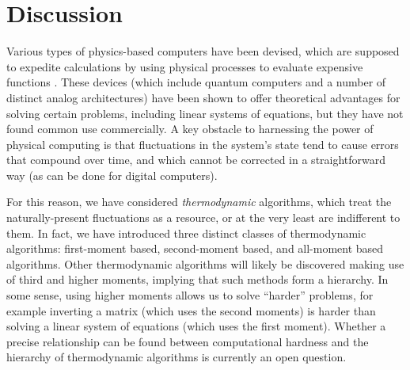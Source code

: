 \documentclass[prx,onecolumn,floatfix,longbibliography,notitlepage, nofootinbib,12pt]{revtex4-2}
\begin{document}
\section{Discussion}

Various types of physics-based computers have been devised, which are supposed to expedite calculations by using physical processes to evaluate expensive functions \cite{haensch2018next, small1993general,feynman1982simulating,preskill2018quantum, nielsen2000quantum}. These devices (which include quantum computers and a number of distinct analog architectures) have been shown to offer theoretical advantages for solving certain problems, including linear systems of equations, but they have not found common use commercially. A key obstacle to harnessing the power of physical computing is that fluctuations in the system's state tend to cause errors that compound over time, and which cannot be corrected in a straightforward way \cite{huang2017analog} (as can be done for digital computers). 

For this reason, we have considered \emph{thermodynamic} algorithms, which treat the naturally-present fluctuations as a resource, or at the very least are indifferent to them. In fact, we have introduced three distinct classes of thermodynamic algorithms: first-moment based, second-moment based, and all-moment based algorithms. Other thermodynamic algorithms will likely be discovered making use of third and higher moments, implying that such methods form a hierarchy. In some sense, using higher moments allows us to solve ``harder'' problems, for example inverting a matrix (which uses the second moments) is harder than solving a linear system of equations (which uses the first moment). Whether a precise relationship can be found between computational hardness and the hierarchy of thermodynamic algorithms is currently an open question.
\end{document}
